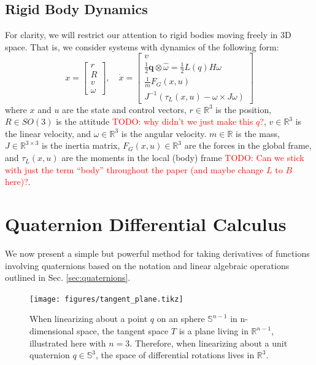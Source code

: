 \documentclass[letterpaper, 10 pt, conference]{ieeeconf}  %
\newcommand{\half}{\frac{1}{2}}
\newcommand{\R}{\mathbb{R}}
\newcommand{\Q}{\mathbb{S}^3}
\newcommand{\q}{\textbf{q}}
\newcommand{\todo}[1]{\textcolor{red}{TODO: #1}}
\begin{document}
    \subsection{Rigid Body Dynamics} \label{sec:rigidbody_dynamics}
        For clarity, we will restrict our attention to rigid bodies moving freely in 3D 
        space. That is, we consider systems with dynamics of the following form:
        \begin{equation} \label{eq:rigid_body_dynamics}
            x = \begin{bmatrix} r \\ R \\ v \\ \omega \end{bmatrix}, \quad 
            \dot{x} = \begin{bmatrix} 
                v \\ 
                \half \q \otimes \hat{\omega} = \half L(q) H \omega \\ 
                \frac{1}{m} F_G(x,u) \\ 
                J^{-1}(\tau_L(x,u) - \omega \times J \omega) 
            \end{bmatrix}
        \end{equation}
        where $x$ and $u$ are the state and control vectors, $r \in \R^3$ is the position, 
        $R \in SO(3)$ is the attitude \todo{why didn't we just make this $q$?}, $v \in \R^3$ is the linear velocity, and 
        $\omega \in \R^3$ is the angular velocity. $m \in \R$ is the mass, 
        $J \in \R^{3\times3}$ is the inertia matrix, $F_G(x,u) \in \R^3$ are the forces in the 
        global frame, and $\tau_L(x,u)$ are the moments in the local (body) frame \todo{Can we stick with just the term ``body'' throughout the paper (and maybe change $L$ to $B$ here)?}.

\section{Quaternion Differential Calculus} \label{sec:Quaternion_Calculus}
    We now present a simple but powerful method for taking derivatives of functions 
    involving quaternions based on the notation and linear algebraic operations outlined 
    in Sec. \ref{sec:quaternions}.
    
    \begin{figure}
        \centering
        \texttt{[image: figures/tangent\_plane.tikz]}
        \caption{
            When linearizing about a point $q$ on an sphere $\mathbb{S}^{n-1}$ in 
            n-dimensional space, the tangent space $T$ is a plane living in $\R^{n-1}$, 
            illustrated here with $n=3$. Therefore, when linearizing about a unit 
            quaternion $q \in \Q$, the space of differential rotations lives in $\R^3$.
        }
        \label{fig:tangent_plane}
    \end{figure}
        
\end{document}
